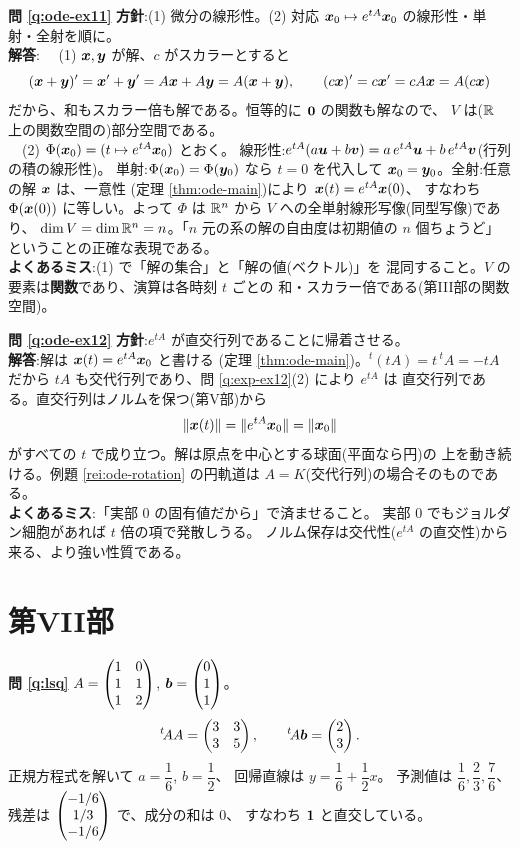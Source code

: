 \bigskip
\noindent\textbf{問 \ref{q:ode-ex11}}\quad
\textbf{方針}:(1) 微分の線形性。(2) 対応 $\bm{x}_0 \mapsto
e^{tA}\bm{x}_0$ の線形性・単射・全射を順に。\\
\textbf{解答}:
　(1) $\bm{x}, \bm{y}$ が解、$c$ がスカラーとすると
\[
(\bm{x} + \bm{y})' = \bm{x}' + \bm{y}' = A\bm{x} + A\bm{y}
= A(\bm{x} + \bm{y}), \qquad
(c\bm{x})' = c\bm{x}' = cA\bm{x} = A(c\bm{x})
\]
だから、和もスカラー倍も解である。恒等的に $\bm{0}$ の関数も解なので、
$V$ は($\mathbb{R}$ 上の関数空間の)部分空間である。\\
　(2) $\Phi(\bm{x}_0) = (t \mapsto e^{tA}\bm{x}_0)$ とおく。
線形性:$e^{tA}(a\bm{u} + b\bm{v}) = a\,e^{tA}\bm{u}
+ b\,e^{tA}\bm{v}$(行列の積の線形性)。
単射:$\Phi(\bm{x}_0) = \Phi(\bm{y}_0)$ なら $t = 0$ を代入して
$\bm{x}_0 = \bm{y}_0$。全射:任意の解 $\bm{x}$ は、一意性
(定理 \ref{thm:ode-main})により $\bm{x}(t) = e^{tA}\bm{x}(0)$、
すなわち $\Phi(\bm{x}(0))$ に等しい。よって $\Phi$ は
$\mathbb{R}^n$ から $V$ への全単射線形写像(同型写像)であり、
$\dim V = \dim \mathbb{R}^n = n$。「$n$ 元の系の解の自由度は初期値の
$n$ 個ちょうど」ということの正確な表現である。\\
\textbf{よくあるミス}:(1) で「解の集合」と「解の値(ベクトル)」を
混同すること。$V$ の要素は\textbf{関数}であり、演算は各時刻 $t$ ごとの
和・スカラー倍である(第III部の関数空間)。

\bigskip
\noindent\textbf{問 \ref{q:ode-ex12}}\quad
\textbf{方針}:$e^{tA}$ が直交行列であることに帰着させる。\\
\textbf{解答}:解は $\bm{x}(t) = e^{tA}\bm{x}_0$ と書ける
(定理 \ref{thm:ode-main})。${}^t(tA) = t\,{}^t\!A = -tA$ だから
$tA$ も交代行列であり、問 \ref{q:exp-ex12}(2) により $e^{tA}$ は
直交行列である。直交行列はノルムを保つ(第V部)から
\[
\|\bm{x}(t)\| = \|e^{tA}\bm{x}_0\| = \|\bm{x}_0\|
\]
がすべての $t$ で成り立つ。解は原点を中心とする球面(平面なら円)の
上を動き続ける。例題 \ref{rei:ode-rotation} の円軌道は
$A = K$(交代行列)の場合そのものである。\\
\textbf{よくあるミス}:「実部 $0$ の固有値だから」で済ませること。
実部 $0$ でもジョルダン細胞があれば $t$ 倍の項で発散しうる。
ノルム保存は交代性($e^{tA}$ の直交性)から来る、より強い性質である。

\section*{第VII部}

\noindent\textbf{問 \ref{q:lsq}}\quad
$A = \begin{pmatrix}1 & 0 \\ 1 & 1 \\ 1 & 2\end{pmatrix}$, $\bm{b} = \begin{pmatrix}0 \\ 1 \\ 1\end{pmatrix}$。
\[
{}^t\!AA = \begin{pmatrix}3 & 3 \\ 3 & 5\end{pmatrix}, \qquad
{}^t\!A\bm{b} = \begin{pmatrix}2 \\ 3\end{pmatrix}.
\]
正規方程式を解いて $a = \dfrac{1}{6}$, $b = \dfrac{1}{2}$、
回帰直線は $y = \dfrac{1}{6} + \dfrac{1}{2}x$。
予測値は $\dfrac{1}{6}, \dfrac{2}{3}, \dfrac{7}{6}$、残差は
$\begin{pmatrix}-1/6 \\ 1/3 \\ -1/6\end{pmatrix}$ で、成分の和は $0$、
すなわち $\bm{1}$ と直交している。

